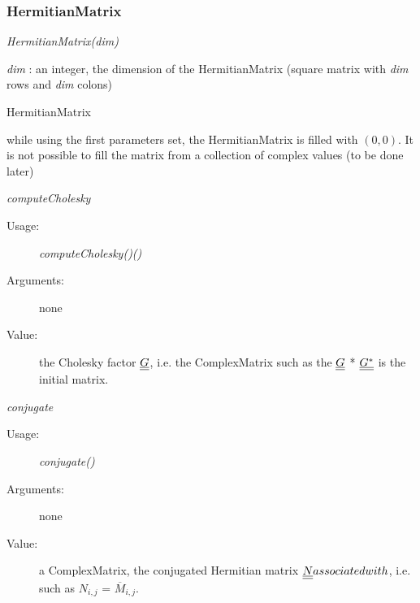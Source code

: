 \newpage
\subsubsection{HermitianMatrix}
\begin{description}

\item[Usage:] \rule{0pt}{1em}
\begin{description}
\item \textit{HermitianMatrix(dim)}
\item
\end{description}

\item[Arguments:]  \rule{0pt}{1em}
\begin{description}
\item \textit{dim}      :        an integer, the dimension of the HermitianMatrix
(square matrix with \textit{dim} rows and \textit{dim} colons)
\end{description}

\item[Value:] HermitianMatrix
\begin{description}
\item while using the first parameters set, the HermitianMatrix is filled with $(0, 0)$. It is not possible to fill the matrix from a collection of complex values (to be done later)
\end{description}

\item[Some methods :]  \rule{0pt}{1em}


\item \textit{computeCholesky}
\begin{description}
\item[Usage:] \textit{computeCholesky()()}
\item[Arguments:] none
\item[Value:] the Cholesky factor ${\underline{\underline{G}}}$, i.e. the ComplexMatrix such as the ${\underline{\underline{G}}}$ * ${\underline{\underline{G^{*}}}}$ is the initial matrix.
\end{description}
\bigskip

\item \textit{conjugate}
\begin{description}
\item[Usage:] \textit{conjugate()}
\item[Arguments:] none
\item[Value:] a ComplexMatrix, the conjugated Hermitian matrix ${\underline{\underline{N}}} associated with $, i.e. such as $N_{i,j}$ = $\overline{M}_{i,j}$.
\end{description}
\bigskip


\end{description}
